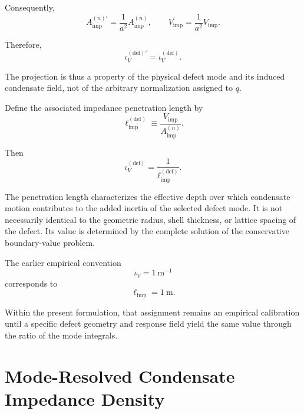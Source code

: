 Consequently,
\begin{equation}
    A_{\mathrm{imp}}^{(n)\prime}
    =
    \frac{1}{a^2}
    A_{\mathrm{imp}}^{(n)},
    \qquad
    V_{\mathrm{imp}}^{\prime}
    =
    \frac{1}{a^2}
    V_{\mathrm{imp}} .
\end{equation}

Therefore,
\begin{equation}
    \iota_V^{(\mathrm{def})\prime}
    =
    \iota_V^{(\mathrm{def})}.
\end{equation}

The projection is thus a property of the physical defect mode and its induced condensate field, not of the arbitrary normalization assigned to \(q\).

Define the associated impedance penetration length by
\begin{equation}
    \ell_{\mathrm{imp}}^{(\mathrm{def})}
    \equiv
    \frac{
    V_{\mathrm{imp}}
    }{
    A_{\mathrm{imp}}^{(n)}
    } .
\end{equation}

Then
\begin{equation}
    \iota_V^{(\mathrm{def})}
    =
    \frac{
    1
    }{
    \ell_{\mathrm{imp}}^{(\mathrm{def})}
    } .
\end{equation}

The penetration length characterizes the effective depth over which condensate motion contributes to the added inertia of the selected defect mode. It is not necessarily identical to the geometric radius, shell thickness, or lattice spacing of the defect. Its value is determined by the complete solution of the conservative boundary-value problem.

The earlier empirical convention
\begin{equation}
    \iota_V
    =
    1\ \mathrm{m}^{-1}
\end{equation}
corresponds to
\begin{equation}
    \ell_{\mathrm{imp}}
    =
    1\ \mathrm{m}.
\end{equation}

Within the present formulation, that assignment remains an empirical calibration until a specific defect geometry and response field yield the same value through the ratio of the mode integrals.

\section{Mode-Resolved Condensate Impedance Density}

